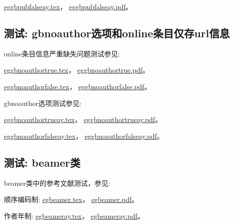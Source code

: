 \href{run:./eggbpubfalseay.tex}{eggbpubfalseay.tex}，
\href{run:./eggbpubfalseay.pdf}{eggbpubfalseay.pdf}。




\subsection{测试: gbnoauthor选项和online条目仅存url信息}\label{sec:opt:noauthor}
online条目信息严重缺失问题测试参见:

\href{run:./eggbnoauthortrue.tex}{eggbnoauthortrue.tex}，
\href{run:./eggbnoauthortrue.pdf}{eggbnoauthortrue.pdf}。

\href{run:./eggbnoauthorfalse.tex}{eggbnoauthorfalse.tex}，
\href{run:./eggbnoauthorfalse.pdf}{eggbnoauthorfalse.pdf}。

gbnoauthor选项测试参见:

\href{run:./eggbnoauthortrueay.tex}{eggbnoauthortrueay.tex}，
\href{run:./eggbnoauthortrueay.pdf}{eggbnoauthortrueay.pdf}。

\href{run:./eggbnoauthorfalseay.tex}{eggbnoauthorfalseay.tex}，
\href{run:./eggbnoauthorfalseay.pdf}{eggbnoauthorfalseay.pdf}。

\subsection{测试: beamer类}

beamer类中的参考文献测试，参见:

顺序编码制:
\href{run:./egbeamer.tex}{egbeamer.tex}，
\href{run:./egbeamer.pdf}{egbeamer.pdf}。

作者年制:
\href{run:./egbeameray.tex}{egbeameray.tex}，
\href{run:./egbeameray.pdf}{egbeameray.pdf}。


